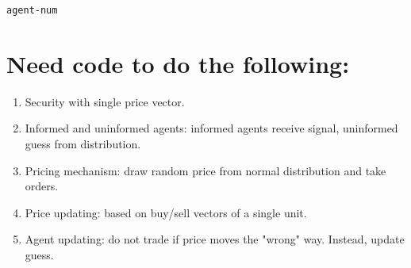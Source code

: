 \documentclass[11pt]{article}
\author{Matt}
\date{\today}
\title{}
\begin{document}
\tableofcontents

\begin{verbatim}
agent-num
\end{verbatim}
\section{Need code to do the following:}
\label{sec:orgbf8bb7e}
\begin{enumerate}
\item Security with single price vector.
\item Informed and uninformed agents: informed agents receive signal, uninformed guess from distribution.
\item Pricing mechanism: draw random price from normal distribution and take orders.
\item Price updating: based on buy/sell vectors of a single unit.
\item Agent updating: do not trade if price moves the "wrong" way. Instead, update guess.
\end{enumerate}
\end{document}
